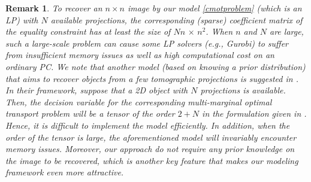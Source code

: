 \documentclass[10pt]{article}
\newtheorem{remark}{Remark}
\begin{document}
\begin{remark}
To recover an $n \times n$ image by our model \eqref{cmotproblem} (which is an LP) with $N$ available projections, the corresponding (sparse) coefficient matrix of the equality constraint has at least the size of $Nn\,\times\,n^2$.
When $n$ and $N$ are large, such a large-scale problem can cause some LP solvers (e.g., Gurobi) to suffer from insufficient memory issues as well
as high computational cost on an ordinary PC. We note that another model (based on knowing a prior distribution) that aims to recover objects from a few tomographic projections is suggested in \cite{abraham2017tomographic,bergounioux2018variational}. In their framework, suppose that a 2D object with $N$ projections is available. Then, the decision variable for the corresponding multi-marginal optimal transport problem will be a tensor of the order $2+N$ in the formulation given in \cite{abraham2017tomographic}. Hence, it is difficult to implement the model efficiently. In addition, when the order of the tensor is large, the aforementioned model will invariably encounter memory issues. Moreover, our approach do not require any prior knowledge on the image to be recovered,
which is another key feature that makes our modeling framework even more attractive.
\end{remark}



\end{document}

